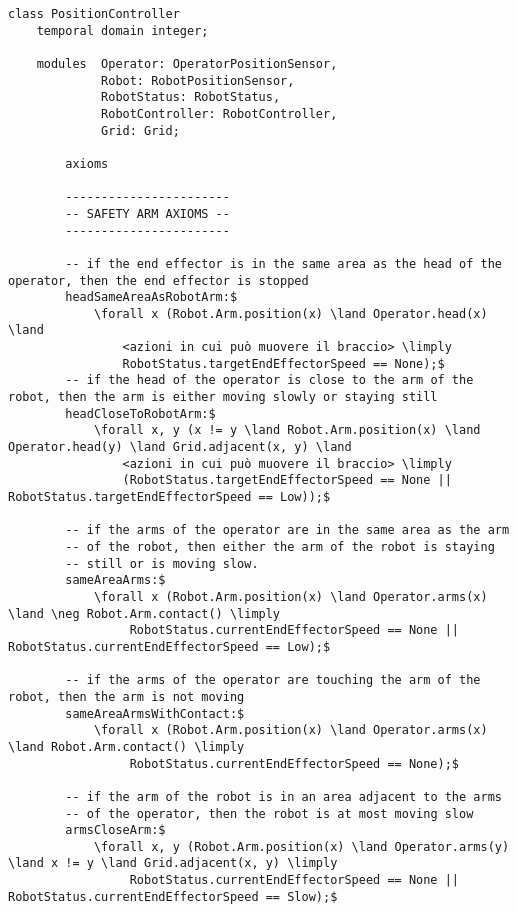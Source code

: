 \begin{lstlisting}[fontadjust, mathescape, frame=single] 
class PositionController
    temporal domain integer;

    modules  Operator: OperatorPositionSensor,
             Robot: RobotPositionSensor,
             RobotStatus: RobotStatus,
             RobotController: RobotController,
             Grid: Grid;
    
        axioms
    
        -----------------------
        -- SAFETY ARM AXIOMS --
        -----------------------
        
        -- if the end effector is in the same area as the head of the operator, then the end effector is stopped
        headSameAreaAsRobotArm:$
            \forall x (Robot.Arm.position(x) \land Operator.head(x) \land
                <azioni in cui può muovere il braccio> \limply
                RobotStatus.targetEndEffectorSpeed == None);$
        -- if the head of the operator is close to the arm of the robot, then the arm is either moving slowly or staying still
        headCloseToRobotArm:$
            \forall x, y (x != y \land Robot.Arm.position(x) \land Operator.head(y) \land Grid.adjacent(x, y) \land
                <azioni in cui può muovere il braccio> \limply
                (RobotStatus.targetEndEffectorSpeed == None || RobotStatus.targetEndEffectorSpeed == Low));$

        -- if the arms of the operator are in the same area as the arm
        -- of the robot, then either the arm of the robot is staying
        -- still or is moving slow.
        sameAreaArms:$
            \forall x (Robot.Arm.position(x) \land Operator.arms(x) \land \neg Robot.Arm.contact() \limply
                 RobotStatus.currentEndEffectorSpeed == None || RobotStatus.currentEndEffectorSpeed == Low);$

        -- if the arms of the operator are touching the arm of the robot, then the arm is not moving
        sameAreaArmsWithContact:$
            \forall x (Robot.Arm.position(x) \land Operator.arms(x) \land Robot.Arm.contact() \limply
                 RobotStatus.currentEndEffectorSpeed == None);$

        -- if the arm of the robot is in an area adjacent to the arms
        -- of the operator, then the robot is at most moving slow
        armsCloseArm:$
            \forall x, y (Robot.Arm.position(x) \land Operator.arms(y) \land x != y \land Grid.adjacent(x, y) \limply
                 RobotStatus.currentEndEffectorSpeed == None || RobotStatus.currentEndEffectorSpeed == Slow);$


\end{lstlisting}
